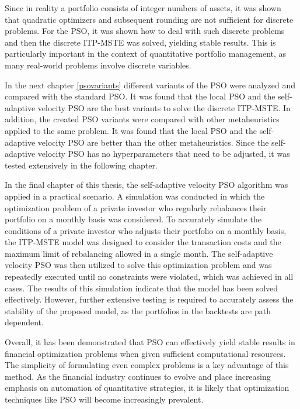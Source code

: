 \documentclass[
  oneside, a4paper, 12pt, openany]{book}
\theoremstyle{definition}
\theoremstyle{definition}
\theoremstyle{definition}
\theoremstyle{definition}
\theoremstyle{remark}
\begin{document}
Since in reality a portfolio consists of integer numbers of assets, it was shown that quadratic optimizers and subsequent rounding are not sufficient for discrete problems. For the PSO, it was shown how to deal with such discrete problems and then the discrete ITP-MSTE was solved, yielding stable results. This is particularly important in the context of quantitative portfolio management, as many real-world problems involve discrete variables.

In the next chapter \ref{psovariants} different variants of the PSO were analyzed and compared with the standard PSO. It was found that the local PSO and the self-adaptive velocity PSO are the best variants to solve the discrete ITP-MSTE. In addition, the created PSO variants were compared with other metaheuristics applied to the same problem. It was found that the local PSO and the self-adaptive velocity PSO are better than the other metaheuristics. Since the self-adaptive velocity PSO has no hyperparameters that need to be adjusted, it was tested extensively in the following chapter.

In the final chapter of this thesis, the self-adaptive velocity PSO algorithm was applied in a practical scenario. A simulation was conducted in which the optimization problem of a private investor who regularly rebalances their portfolio on a monthly basis was considered. To accurately simulate the conditions of a private investor who adjusts their portfolio on a monthly basis, the ITP-MSTE model was designed to consider the transaction costs and the maximum limit of rebalancing allowed in a single month. The self-adaptive velocity PSO was then utilized to solve this optimization problem and was repeatedly executed until no constraints were violated, which was achieved in all cases. The results of this simulation indicate that the model has been solved effectively. However, further extensive testing is required to accurately assess the stability of the proposed model, as the portfolios in the backtests are path dependent.

Overall, it has been demonstrated that PSO can effectively yield stable results in financial optimization problems when given sufficient computational resources. The simplicity of formulating even complex problems is a key advantage of this method. As the financial industry continues to evolve and place increasing emphasis on automation of quantitative strategies, it is likely that optimization techniques like PSO will become increasingly prevalent.

  


\end{document}
